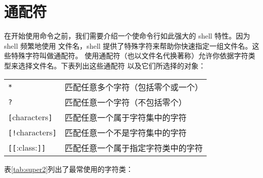 \section{通配符} %
\label{sec:通配符}
在开始使用命令之前，我们需要介绍一个使命令行如此强大的 shell 特性。因为 shell 频繁地使用 文件名，shell 提供了特殊字符来帮助你快速指定一组文件名。这些特殊字符叫做通配符。 使用通配符（也以文件名代换著称）允许你依据字符类型来选择文件名。下表列出这些通配符 以及它们所选择的对象：

\begin{center} 
\tablelasttail{\bottomrule}

\begin{supertabular}{p{4.cm}p{10cm}}
\verb"*"	& 匹配任意多个字符（包括零个或一个） \\
\verb"?"	& 匹配任意一个字符（不包括零个）\\
\verb"["characters\verb"]"	& 匹配任意一个属于字符集中的字符 \\
\verb"["\verb"!"characters\verb"]"	& 匹配任意一个不是字符集中的字符 \\
\verb"["\verb"[":class:\verb"]"\verb"]"	& 匹配任意一个属于指定字符类中的字符 \\

\end{supertabular}
\end{center}

\par 表\ref{tab:super2}列出了最常使用的字符类：

